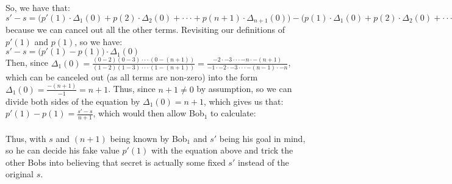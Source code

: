 \documentclass{article}
\begin{document}
So, we have that: \\[.3cm]
\indent\indent $s' - s =
\Big(p'(1)\cdot\Delta_1(0) + p(2)\cdot\Delta_2(0) + \cdot\cdot\cdot + p(n+1)\cdot\Delta_{n+1}(0)\Big) - 
\Big(p(1)\cdot\Delta_1(0) + p(2)\cdot\Delta_2(0) + \cdot\cdot\cdot + p(n+1)\cdot\Delta_{n+1}(0)\Big) = 
p'(1)\cdot\Delta_1(0) - p(1)\cdot\Delta_1(0) = \big(p'(1) - p(1)\big)\cdot\Delta_1(0)$ \\[.3cm]
because we can cancel out all the other terms. Revisiting our definitions of $p'(1)$ and $p(1)$, so we have: \\[.3cm]
\indent\indent $s' - s = \big(p'(1) - p(1)\big)\cdot\Delta_1(0)$ \\

Then, since $\Delta_1(0) = \frac{(0-2)(0-3)\cdot\cdot\cdot(0-(n+1))}{(1-2)(1-3)\cdot\cdot\cdot (1-(n+1))} = 
\frac{-2\cdot-3\cdot\cdot\cdot-n\cdot-(n+1)}{-1\cdot-2\cdot-3\cdot\cdot\cdot-(n-1)\cdot-n}$, which can be canceled out (as all terms are non-zero) into the form $\Delta_1(0) = \frac{-(n+1)}{-1} = n+1$. Thus, since $n+1\neq0$ by assumption, so we can divide both sides of the equation by $\Delta_1(0) = n + 1$, which gives us that: $p'(1) - p(1) = \frac{s'-s}{n+1}$, which would then allow Bob$_1$ to calculate: \\[.3cm]
\indent{} \\

Thus, with $s$ and $(n+1)$ being known by Bob$_1$ and $s'$ being his goal in mind, so he can decide his fake value $p'(1)$ with the equation above and trick the other Bobs into believing that secret is actually some fixed $s'$ instead of the original $s$.
\end{document}
